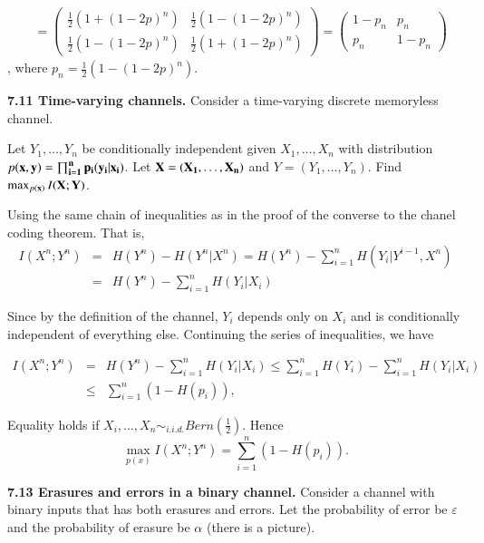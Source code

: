 \documentclass[10pt]{article}
\begin{document}
\begin{tiny}
\begin{multicols}{3}
\begin{align*}
&= \begin{pmatrix}
        \frac{1}{2}(1 + (1-2p)^n) & \frac{1}{2}(1 - (1-2p)^n) \\
        \frac{1}{2}(1 - (1-2p)^n) & \frac{1}{2}(1 + (1-2p)^n) \end{pmatrix}
    = \begin{pmatrix} 1 - p_n & p_n \\
        p_n & 1 - p_n \end{pmatrix} 
\end{align*} , where  $p_n = \frac{1}{2}(1 - (1-2p)^n)$.

\textbf{\scriptsize 7.11 Time-varying channels.}
Consider a time-varying discrete memoryless channel.

Let $Y_1,\dots,Y_n$ be conditionally independent given $X_1,\dots,X_n$ with distribution $p(\bf{x}, \bf{y}) = \prod_{i=1}^{n}p_i(y_i|x_i)$. Let $\bf{X} = (X_1,\dots,X_n)$ and $Y=(Y_1,\dots,Y_n)$. Find $\max_{p(\bf{x})} I(\bf{X};\bf{Y})$.

Using the same chain of inequalities as in the proof of the converse to the chanel coding theorem. That is,
\begin{eqnarray*}
    I(X^n;Y^n) &=& H(Y^n) - H(Y^n|X^n)  = H(Y^n) - \sum_{i=1}^n H(Y_i | Y^{i-1}, X^n)  \\
        &=& H(Y^n) - \sum_{i=1}^n H(Y_i | X_i)
\end{eqnarray*}

Since by the definition of the channel, $Y_i$ depends only on $X_i$ and is conditionally independent of everything else. Continuing the series of inequalities, we have

\begin{eqnarray*}
    I(X^n;Y^n) &=& H(Y^n) - \sum_{i=1}^n H(Y_i | X_i) 
    \le \sum_{i=1}^{n} H(Y_i) - \sum_{i=1}^n H(Y_i | X_i) \\ 
    &\le& \sum_{i=1}^{n} (1-H(p_i)),
\end{eqnarray*}

Equality holds if $X_i,\dots,X_n \sim_{i.i.d.} Bern(\frac{1}{2})$. Hence
\begin{equation*}
    \max_{p(x)} I(X^n; Y^n) = \sum_{i=1}^{n}(1-H(p_i)).
\end{equation*}

\textbf{\scriptsize 7.13 Erasures and errors in a binary channel.}
Consider a channel with binary inputs that has both erasures and errors. Let the probability of error be $\varepsilon$ and the probability of erasure be $\alpha$ (there is a picture).


\end{multicols}
\end{tiny}
\end{document}
